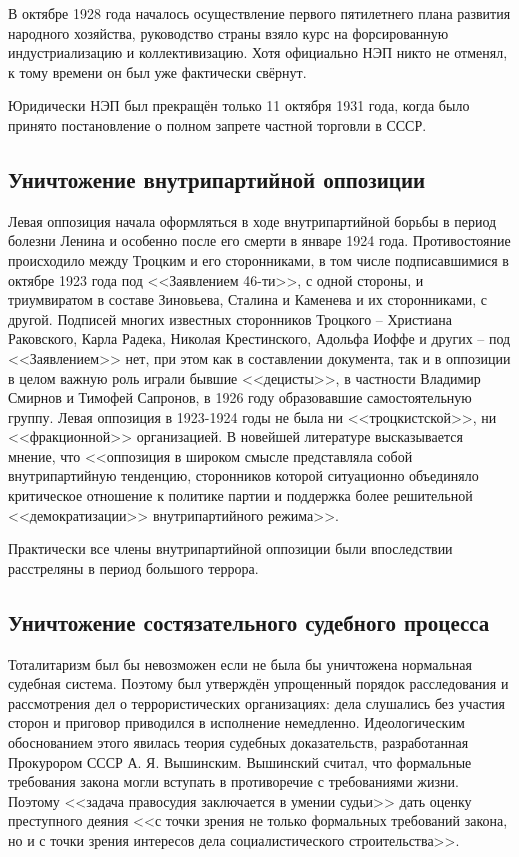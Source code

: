 \documentclass[12pt]{article}
\begin{document}
  В октябре 1928 года началось осуществление первого пятилетнего плана развития народного хозяйства,
  руководство страны взяло курс на форсированную индустриализацию и коллективизацию.
  Хотя официально НЭП никто не отменял, к тому времени он был уже фактически свёрнут.

  Юридически НЭП был прекращён только 11 октября 1931 года, когда было принято постановление о полном запрете частной торговли в СССР.

  \subsection{Уничтожение внутрипартийной оппозиции}
  Левая оппозиция начала оформляться в ходе внутрипартийной борьбы в период болезни Ленина и особенно после его смерти в январе 1924 года.
  Противостояние происходило между Троцким и его сторонниками, в том числе подписавшимися в октябре 1923 года под <<Заявлением 46-ти>>,
  с одной стороны, и триумвиратом в составе Зиновьева, Сталина и Каменева и их сторонниками, с другой.
  Подписей многих известных сторонников Троцкого -- Христиана Раковского, Карла Радека, Николая Крестинского, Адольфа Иоффе и других --
  под <<Заявлением>> нет, при этом как в составлении документа, так и в оппозиции в целом важную роль играли бывшие <<децисты>>,
  в частности Владимир Смирнов и Тимофей Сапронов, в 1926 году образовавшие самостоятельную группу.
  Левая оппозиция в 1923-1924 годы не была ни <<троцкистской>>, ни <<фракционной>> организацией.
  В новейшей литературе высказывается мнение, что <<оппозиция в широком смысле представляла собой внутрипартийную тенденцию,
  сторонников которой ситуационно объединяло критическое отношение к политике партии и поддержка более решительной <<демократизации>> внутрипартийного режима>>.

  Практически все члены внутрипартийной оппозиции были впоследствии расстреляны в период большого террора.

  \subsection{Уничтожение состязательного судебного процесса}
  Тоталитаризм был бы невозможен если не была бы уничтожена нормальная судебная система.
  Поэтому был утверждён упрощенный порядок расследования и рассмотрения дел о террористических организациях:
  дела слушались без участия сторон и приговор приводился в исполнение немедленно.
  Идеологическим обоснованием этого явилась теория судебных доказательств, разработанная Прокурором СССР А. Я. Вышинским.
  Вышинский считал, что формальные требования закона могли вступать в противоречие с требованиями жизни.
  Поэтому <<задача правосудия заключается в умении судьи>> дать оценку преступного деяния <<с точки зрения не только формальных требований закона,
  но и с точки зрения интересов дела социалистического строительства>>.
\end{document}

